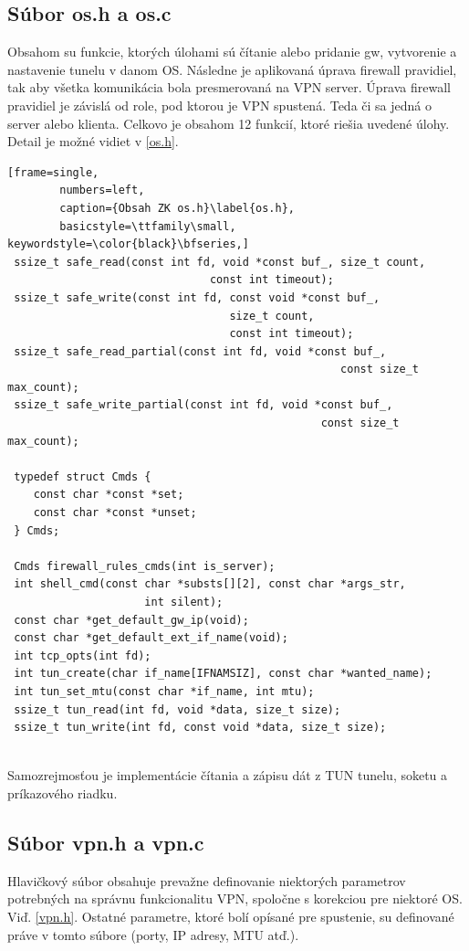  \subsection{Súbor os.h a os.c}
Obsahom su funkcie, ktorých úlohami sú čítanie alebo pridanie \acrshort{gw}, vytvorenie a nastavenie tunelu v danom OS. Následne je aplikovaná úprava firewall pravidiel, tak aby všetka komunikácia bola presmerovaná na VPN server. Úprava firewall pravidiel je závislá od role, pod ktorou je VPN spustená. Teda či sa jedná o server alebo klienta. 
Celkovo je obsahom 12 funkcií, ktoré riešia uvedené úlohy. Detail je možné vidiet v \ref{os.h}.
 
 \begin{minipage}{\linewidth} 	
	\begin{lstlisting}[frame=single,
		numbers=left,
		caption={Obsah ZK os.h}\label{os.h},
		basicstyle=\ttfamily\small, keywordstyle=\color{black}\bfseries,]
 ssize_t safe_read(const int fd, void *const buf_, size_t count, 
 						       const int timeout);
 ssize_t safe_write(const int fd, const void *const buf_, 
 							      size_t count,
 							      const int timeout);
 ssize_t safe_read_partial(const int fd, void *const buf_,
 							 					   const size_t max_count);
 ssize_t safe_write_partial(const int fd, void *const buf_, 
 							    		     	const size_t max_count);
 
 typedef struct Cmds {
 	const char *const *set;
 	const char *const *unset;
 } Cmds;
 
 Cmds firewall_rules_cmds(int is_server);
 int shell_cmd(const char *substs[][2], const char *args_str,
 			         int silent);
 const char *get_default_gw_ip(void);
 const char *get_default_ext_if_name(void);
 int tcp_opts(int fd);
 int tun_create(char if_name[IFNAMSIZ], const char *wanted_name);
 int tun_set_mtu(const char *if_name, int mtu);
 ssize_t tun_read(int fd, void *data, size_t size);
 ssize_t tun_write(int fd, const void *data, size_t size); 
\end{lstlisting}
\end{minipage}\\ 
Samozrejmosťou je implementácie čítania a zápisu dát z TUN tunelu, soketu a príkazového riadku. 
 \subsection{Súbor vpn.h a vpn.c}
 Hlavičkový súbor obsahuje prevažne definovanie niektorých parametrov potrebných na správnu funkcionalitu VPN, spoločne s korekciou pre niektoré OS. Viď. \ref{vpn.h}. Ostatné parametre, ktoré bolí opísané pre spustenie, su definované práve v tomto súbore (porty, IP adresy, MTU atď.).
 
